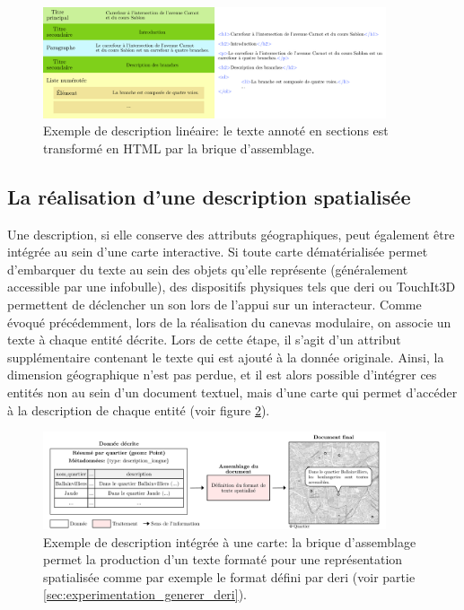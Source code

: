 \begin{figure}[ht]
    \centering
    \includegraphics[width=0.9\textwidth]{images/description/exemple_desc_lineaire.pdf
    }
    \caption[Exemple de description linéaire.]{Exemple de description linéaire: le texte annoté en sections est transformé en HTML par la brique d'assemblage.}
    \label{fig:desc_ex_desc_lineaire}
\end{figure}

\subsection{La réalisation d'une description spatialisée}

\label{sec:description_carte}

Une description, si elle conserve des attributs géographiques, peut également être intégrée au sein d'une carte interactive. Si toute carte dématérialisée permet d'embarquer du texte au sein des objets qu'elle représente (généralement accessible par une infobulle), des dispositifs physiques tels que \gls{deri} \citep{Brock2012} ou TouchIt3D \citep{barvir2021} permettent de déclencher un son lors de l'appui sur un interacteur. Comme évoqué précédemment, lors de la réalisation du canevas modulaire, on associe un texte à chaque entité décrite. Lors de cette étape, il s'agit d'un attribut supplémentaire contenant le texte qui est ajouté à la donnée originale. Ainsi, la dimension géographique n'est pas perdue, et il est alors possible d'intégrer ces entités non au sein d'un document textuel, mais d'une carte qui permet d'accéder à la description de chaque entité (voir figure \ref{fig:desc_ex_desc_spatialisee}).

\begin{figure}[ht]
    \centering
    \includegraphics[width=0.9\textwidth]{images/description/exemple_desc_spatialise.pdf
    }
    \caption[Exemple de description spatialisée.]{Exemple de description intégrée à une carte: la brique d'assemblage permet la production d'un texte formaté pour une représentation spatialisée comme par exemple le format défini par \gls{deri} (voir partie \ref{sec:experimentation_generer_deri}).}
    \label{fig:desc_ex_desc_spatialisee}
\end{figure}

